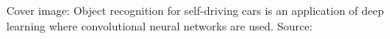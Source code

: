 \documentclass{article}
\begin{document}


\newpage
Cover image: Object recognition for self-driving cars is an application of deep learning where convolutional neural networks are used. Source: \cite{effps}


\vspace{1.5cm}
\tableofcontents
\vspace{2.8cm}




















\newpage

\end{document}
